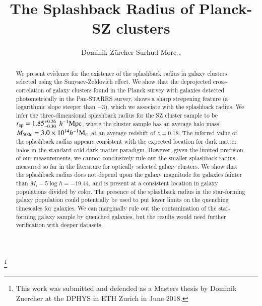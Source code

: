 \documentclass[iop, apjl, twocolappendix, numberedappendix]{emulateapj}
\def\mpch{h^{-1}{\rm Mpc}}
\def\msunh{h^{-1}{\rm M_{\odot}}}
\begin{document}
\title{The Splashback Radius of Planck-SZ clusters}

\thanks{This work was submitted and defended as a Masters thesis by Dominik
Zuercher at the DPHYS in ETH Zurich in June 2018.}

\author{
Dominik Zürcher 
Surhud More , 
}

\begin{abstract}
We present evidence for the existence of the splashback radius in
galaxy clusters selected using the Sunyaev-Zeldovich effect.  We show
that the deprojected cross-correlation of galaxy clusters found in the
Planck survey with galaxies detected photometrically in the Pan-STARRS
survey, shows a sharp steepening feature (a logarithmic slope steeper
than $-3$), which we associate with the splashback radius. We infer
the three-dimensional splashback radius for the SZ cluster sample to
be $r_{\rm sp}=1.85_{-0.30}^{+0.26}$ $\mpch$, where the cluster sample
has an average halo mass $M_{\rm 500c}=3.0\times10^{14}\msunh$ at an
average redshift of $z=0.18$. The inferred value of the splashback
radius appears consistent with the expected location for dark matter halos
in the standard cold dark matter paradigm. However, given the limited
precision of our measurements, we cannot conclusively rule out the
smaller splashback radius measured so far in the literature for
optically selected galaxy clusters. We show that the splashback radius
does not depend upon the galaxy magnitude for galaxies fainter than
$M_i-5\log h=-19.44$, and is present at a consistent location in
galaxy populations divided by color. The presence of the splashback
radius in the star-forming galaxy population could potentially be used to put
lower limits on the quenching timescales for galaxies. We can marginally rule
out the contamination of the star-forming galaxy sample by quenched galaxies,
but the results would need further verification with deeper datasets.

\end{abstract}
\end{document}

